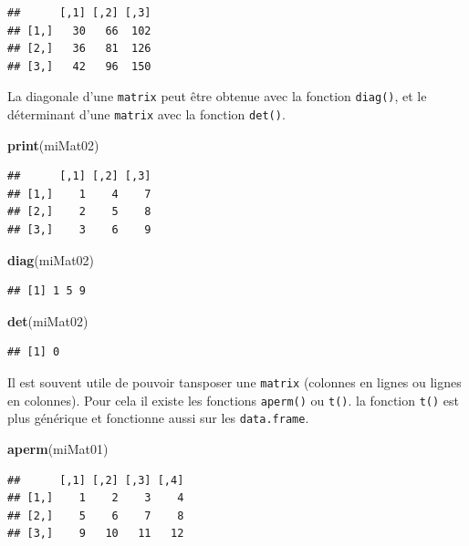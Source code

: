 \documentclass[]{book}
\newenvironment{Shaded}{\begin{snugshade}}{\end{snugshade}}
\newcommand{\KeywordTok}[1]{\textcolor[rgb]{0.13,0.29,0.53}{\textbf{#1}}}
\newcommand{\NormalTok}[1]{#1}
\begin{document}
\begin{verbatim}
##      [,1] [,2] [,3]
## [1,]   30   66  102
## [2,]   36   81  126
## [3,]   42   96  150
\end{verbatim}

La diagonale d'une \texttt{matrix} peut être obtenue avec la fonction \texttt{diag()}, et le déterminant d'une \texttt{matrix} avec la fonction \texttt{det()}.

\begin{Shaded}
\begin{Highlighting}[]
\KeywordTok{print}\NormalTok{(miMat02)}
\end{Highlighting}
\end{Shaded}

\begin{verbatim}
##      [,1] [,2] [,3]
## [1,]    1    4    7
## [2,]    2    5    8
## [3,]    3    6    9
\end{verbatim}

\begin{Shaded}
\begin{Highlighting}[]
\KeywordTok{diag}\NormalTok{(miMat02)}
\end{Highlighting}
\end{Shaded}

\begin{verbatim}
## [1] 1 5 9
\end{verbatim}

\begin{Shaded}
\begin{Highlighting}[]
\KeywordTok{det}\NormalTok{(miMat02)}
\end{Highlighting}
\end{Shaded}

\begin{verbatim}
## [1] 0
\end{verbatim}

Il est souvent utile de pouvoir tansposer une \texttt{matrix} (colonnes en lignes ou lignes en colonnes). Pour cela il existe les fonctions \texttt{aperm()} ou \texttt{t()}. la fonction \texttt{t()} est plus générique et fonctionne aussi sur les \texttt{data.frame}.

\begin{Shaded}
\begin{Highlighting}[]
\KeywordTok{aperm}\NormalTok{(miMat01)}
\end{Highlighting}
\end{Shaded}

\begin{verbatim}
##      [,1] [,2] [,3] [,4]
## [1,]    1    2    3    4
## [2,]    5    6    7    8
## [3,]    9   10   11   12
\end{verbatim}
\end{document}
